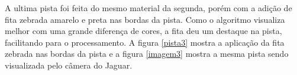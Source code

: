 	\begin{figure}[H]
		\centering
\end{figure}

A ultima pista foi feita do mesmo material da segunda, porém com a adição de fita zebrada amarelo e preta nas bordas da pista. Como o algoritmo visualiza melhor com uma grande diferença de cores, a fita deu um destaque na pista, facilitando para o processamento. A figura \ref{pista3} mostra a aplicação da fita zebrada nas bordas da pista e a figura \ref{imagem3} mostra a mesma pista sendo visualizada pelo câmera do Jaguar.

	\begin{figure}[H]
		\centering
\end{figure}

